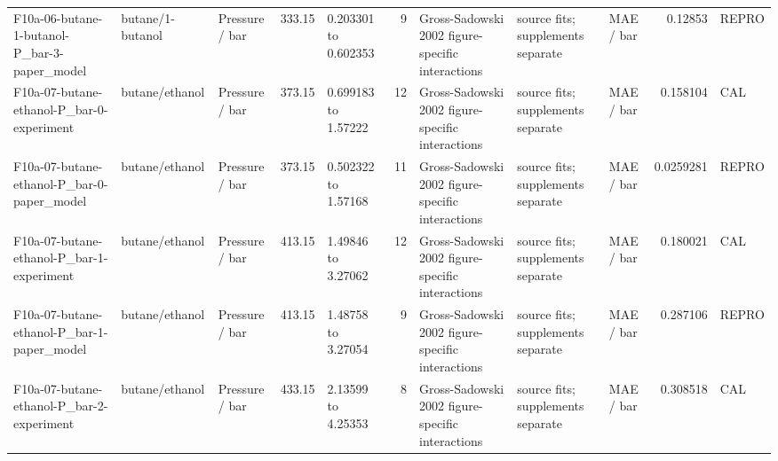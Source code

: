 \begin{landscape}
\begin{longtable}{L{1.9cm}L{2.5cm}L{2.1cm}L{1.6cm}L{1.6cm}rL{2.4cm}L{1.9cm}L{2.2cm}rL{1cm}}
F10a-\allowbreak{}06-\allowbreak{}butane-\allowbreak{}1-\allowbreak{}butanol-\allowbreak{}P\_\allowbreak{}bar-\allowbreak{}3-\allowbreak{}paper\_\allowbreak{}model & butane/\allowbreak{}1-\allowbreak{}butanol & Pressure /\allowbreak{} bar & 333.15 & 0.203301 to 0.602353 & 9 & Gross-\allowbreak{}Sadowski 2002 figure-\allowbreak{}specific interactions & source fits; supplements separate & MAE /\allowbreak{} bar & 0.12853 & REPRO \\
F10a-\allowbreak{}07-\allowbreak{}butane-\allowbreak{}ethanol-\allowbreak{}P\_\allowbreak{}bar-\allowbreak{}0-\allowbreak{}experiment & butane/\allowbreak{}ethanol & Pressure /\allowbreak{} bar & 373.15 & 0.699183 to 1.57222 & 12 & Gross-\allowbreak{}Sadowski 2002 figure-\allowbreak{}specific interactions & source fits; supplements separate & MAE /\allowbreak{} bar & 0.158104 & CAL \\
F10a-\allowbreak{}07-\allowbreak{}butane-\allowbreak{}ethanol-\allowbreak{}P\_\allowbreak{}bar-\allowbreak{}0-\allowbreak{}paper\_\allowbreak{}model & butane/\allowbreak{}ethanol & Pressure /\allowbreak{} bar & 373.15 & 0.502322 to 1.57168 & 11 & Gross-\allowbreak{}Sadowski 2002 figure-\allowbreak{}specific interactions & source fits; supplements separate & MAE /\allowbreak{} bar & 0.0259281 & REPRO \\
F10a-\allowbreak{}07-\allowbreak{}butane-\allowbreak{}ethanol-\allowbreak{}P\_\allowbreak{}bar-\allowbreak{}1-\allowbreak{}experiment & butane/\allowbreak{}ethanol & Pressure /\allowbreak{} bar & 413.15 & 1.49846 to 3.27062 & 12 & Gross-\allowbreak{}Sadowski 2002 figure-\allowbreak{}specific interactions & source fits; supplements separate & MAE /\allowbreak{} bar & 0.180021 & CAL \\
F10a-\allowbreak{}07-\allowbreak{}butane-\allowbreak{}ethanol-\allowbreak{}P\_\allowbreak{}bar-\allowbreak{}1-\allowbreak{}paper\_\allowbreak{}model & butane/\allowbreak{}ethanol & Pressure /\allowbreak{} bar & 413.15 & 1.48758 to 3.27054 & 9 & Gross-\allowbreak{}Sadowski 2002 figure-\allowbreak{}specific interactions & source fits; supplements separate & MAE /\allowbreak{} bar & 0.287106 & REPRO \\
F10a-\allowbreak{}07-\allowbreak{}butane-\allowbreak{}ethanol-\allowbreak{}P\_\allowbreak{}bar-\allowbreak{}2-\allowbreak{}experiment & butane/\allowbreak{}ethanol & Pressure /\allowbreak{} bar & 433.15 & 2.13599 to 4.25353 & 8 & Gross-\allowbreak{}Sadowski 2002 figure-\allowbreak{}specific interactions & source fits; supplements separate & MAE /\allowbreak{} bar & 0.308518 & CAL \\

\end{longtable}
\end{landscape}
